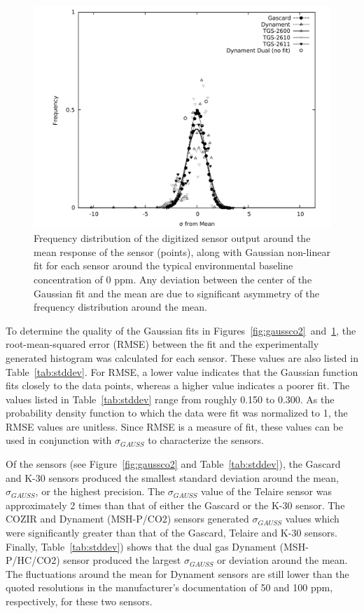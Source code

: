 \documentclass[sensors,article,submit,moreauthors,pdftex]{Definitions/mdpi}
\begin{document}
			\begin{figure}[!t]
				\centering
				\includegraphics[width=\columnwidth]{honey8.pdf}
				\caption{Frequency distribution of the digitized sensor output around the mean response of the sensor (points), along with Gaussian non-linear fit for each  sensor around the typical environmental baseline concentration of 0 ppm.
				Any deviation between the center of the Gaussian fit and the mean are due to significant asymmetry of the frequency distribution around the mean.}
				\label{fig:gaussch4}
			\end{figure}
			
			To determine the quality of the Gaussian fits in Figures~\ref{fig:gaussco2}~and~\ref{fig:gaussch4}, the root-mean-squared error (RMSE) between the fit and the experimentally generated histogram was calculated for each sensor.
			These values are also listed in Table~\ref{tab:stddev}.
			For RMSE, a lower value indicates that the Gaussian function fits closely to the data points, whereas a higher value indicates a poorer fit.
			The values listed in Table~\ref{tab:stddev} range from roughly 0.150 to 0.300.
			As the probability density function to which the data were fit was normalized to 1, the RMSE values are unitless.
			Since RMSE is a measure of fit, these values can be used in conjunction with $\sigma_{GAUSS}$ to characterize the sensors.
			
			
			Of the  sensors (see Figure~\ref{fig:gaussco2} and Table~\ref{tab:stddev}), the Gascard and K-30 sensors produced the smallest standard deviation around the mean, $\sigma_{GAUSS}$, or the highest precision.
			The $\sigma_{GAUSS}$ value of the Telaire sensor was approximately 2 times than that of either the Gascard or the K-30 sensor.
			The COZIR and Dynament (MSH-P/CO2) sensors generated $\sigma_{GAUSS}$ values which were significantly greater than that of the Gascard, Telaire and K-30 sensors.
			Finally, Table~\ref{tab:stddev}) shows that the dual gas Dynament (MSH-P/HC/CO2) sensor produced the largest $\sigma_{GAUSS}$ or deviation around the mean.
			The fluctuations around the mean for Dynament sensors are still lower than the quoted resolutions in the manufacturer's documentation of 50 and 100 ppm, respectively, for these two sensors.
			
\end{document}
